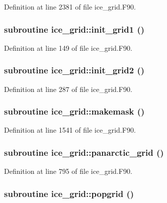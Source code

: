 Definition at line 2381 of file ice\_\-grid.F90.\hypertarget{namespaceice__grid_ace97d5a2cdb55b3e8caa37f125635f14}{
\subsubsection[{init\_\-grid1}]{\setlength{\rightskip}{0pt plus 5cm}subroutine ice\_\-grid::init\_\-grid1 ()}}
\label{namespaceice__grid_ace97d5a2cdb55b3e8caa37f125635f14}


Definition at line 149 of file ice\_\-grid.F90.\hypertarget{namespaceice__grid_a1443c2d00f599d16be96edeb376c3e97}{
\subsubsection[{init\_\-grid2}]{\setlength{\rightskip}{0pt plus 5cm}subroutine ice\_\-grid::init\_\-grid2 ()}}
\label{namespaceice__grid_a1443c2d00f599d16be96edeb376c3e97}


Definition at line 287 of file ice\_\-grid.F90.\hypertarget{namespaceice__grid_a3b4d1b3eb2836fed2bf8389411d1dbf0}{
\subsubsection[{makemask}]{\setlength{\rightskip}{0pt plus 5cm}subroutine ice\_\-grid::makemask ()}}
\label{namespaceice__grid_a3b4d1b3eb2836fed2bf8389411d1dbf0}


Definition at line 1541 of file ice\_\-grid.F90.\hypertarget{namespaceice__grid_ae6e42c3f57ad49e30c85c71573096781}{
\subsubsection[{panarctic\_\-grid}]{\setlength{\rightskip}{0pt plus 5cm}subroutine ice\_\-grid::panarctic\_\-grid ()}}
\label{namespaceice__grid_ae6e42c3f57ad49e30c85c71573096781}


Definition at line 795 of file ice\_\-grid.F90.\hypertarget{namespaceice__grid_a24e5c873e7aef7bffaa80de04d205f1c}{
\subsubsection[{popgrid}]{\setlength{\rightskip}{0pt plus 5cm}subroutine ice\_\-grid::popgrid ()}}
\label{namespaceice__grid_a24e5c873e7aef7bffaa80de04d205f1c}


